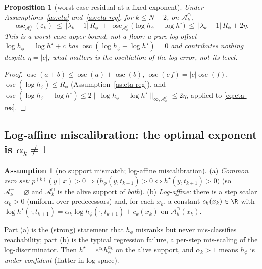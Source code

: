 \documentclass[11pt]{article}
\newcommand{\Aset}{\mathcal{A}}
\newcommand{\hs}{h^\star}
\DeclareMathOperator*{\osc}{osc}
\theoremstyle{plain}
\newtheorem{proposition}{Proposition}
\theoremstyle{definition}
\newtheorem{assumption}{Assumption}
\theoremstyle{remark}
\begin{document}
\begin{proposition}[worst-case residual at a fixed exponent]
\label{prop:eta-residual}
Under Assumptions~\ref{as:eta} and~\ref{as:eta-reg}, for $k\le N-2$, on $\Aset^\cap_k$,
\[
\osc_{\Aset^\cap_k}(\varepsilon_k)\ \le\ |\lambda_k-1|\,R_\phi\ +\ \osc_{\Aset^\cap_k}\!\big(\log h_\phi-\log\hs\big)
\ \le\ |\lambda_k-1|\,R_\phi+2\eta .
\]
This is a worst-case \emph{upper} bound, not a floor: a pure log-offset
$\log h_\phi=\log\hs+c$ has $\osc(\log h_\phi-\log\hs)=0$ and contributes nothing despite
$\eta=|c|$; what matters is the \emph{oscillation} of the log-error, not its level.
\end{proposition}
\begin{proof}
$\osc(a+b)\le\osc(a)+\osc(b)$, $\osc(c\,f)=|c|\osc(f)$, $\osc(\log h_\phi)\le R_\phi$
(Assumption~\ref{as:eta-reg}), and $\osc(\log h_\phi-\log\hs)\le2\|\log h_\phi-\log\hs\|_{\infty,\Aset^\cap_k}\le2\eta$,
applied to \eqref{eq:eta-res}.
\end{proof}

\subsection{Log-affine miscalibration: the optimal exponent is $\alpha_k\ne1$}

\begin{assumption}[no support mismatch; log-affine miscalibration]
\label{as:affine}
\textup{(a)} \emph{Common zero set:} $p^{(k)}(y\mid x)>0\Rightarrow\big(h_\phi(y,t_{k+1})>0\Leftrightarrow\hs(y,t_{k+1})>0\big)$
(so $\Aset^+_k=\varnothing$ and $\Aset^\cap_k$ is the alive support of \emph{both}).
\textup{(b)} \emph{Log-affine:} there is a step scalar $\alpha_k>0$ (uniform over predecessors)
and, for each $x_k$, a constant $c_k(x_k)\in\R$ with
$\log\hs(\cdot,t_{k+1})=\alpha_k\log h_\phi(\cdot,t_{k+1})+c_k(x_k)$ on $\Aset^\cap_k(x_k)$.
\end{assumption}

Part (a) is the (strong) statement that $h_\phi$ misranks but never mis-classifies
reachability; part (b) is the typical regression failure, a per-step mis-scaling of the
log-discriminator. Then $\hs=e^{c_k}h_\phi^{\alpha_k}$ on the alive support, and $\alpha_k>1$
means $h_\phi$ is \emph{under-confident} (flatter in log-space).
\end{document}
